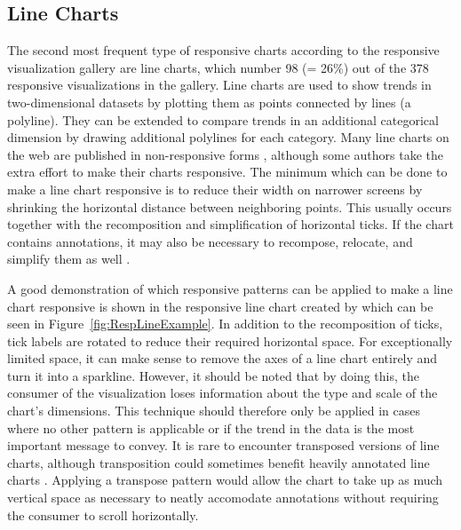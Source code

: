 \subsection{Line Charts}
\label{sec:LineChartExamples}

The second most frequent type of responsive charts according to the
responsive visualization gallery
\parencite{DesignPatternsTradeOffsRespVis} are line charts, which
number 98 (= 26\%) out of the 378 responsive visualizations in the
gallery. Line charts are used to show trends in two-dimensional
datasets by plotting them as points connected by lines (a polyline).
They can be extended to compare trends in an additional categorical
dimension by drawing additional polylines for each category. Many line
charts on the web are published in non-responsive forms
\parencite{HLine,HLine2}, although some authors take the extra effort
to make their charts responsive. The minimum which can be done to make
a line chart responsive is to reduce their width
\parencite{RespRadialScatterHLine} on narrower screens by shrinking
the horizontal distance between neighboring points. This usually
occurs together with the recomposition and simplification of
horizontal ticks. If the chart contains annotations, it may also be
necessary to recompose, relocate, and simplify them as well
\parencite{RespHLines,RespHLine,RespHBarHLine,RespHLineHStackedBar}.

A good demonstration of which responsive patterns can be applied to
make a line chart responsive is shown in the responsive line chart
created by \textcite{RespVis} which can be seen in
Figure~\ref{fig:RespLineExample}. In addition to the recomposition of
ticks, tick labels are rotated to reduce their required horizontal
space. For exceptionally limited space, it can make sense to remove
the axes of a line chart entirely and turn it into a sparkline.
However, it should be noted that by doing this, the consumer of the
visualization loses information about the type and scale of the
chart's dimensions. This technique should therefore only be applied in
cases where no other pattern is applicable or if the trend in the data
is the most important message to convey. It is rare to encounter
transposed versions of line charts, although transposition could
sometimes benefit heavily annotated line charts
\parencite{VLine}. Applying a transpose pattern would allow the chart
to take up as much vertical space as necessary to neatly accomodate
annotations without requiring the consumer to scroll horizontally.



